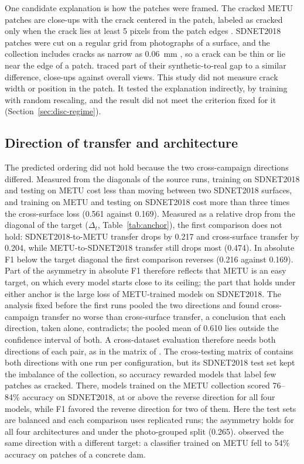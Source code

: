 \documentclass[pdflatex,sn-apa]{sn-jnl}
\begin{document}
One candidate explanation is how the patches were framed. The cracked METU patches are close-ups with the crack centered in the patch, labeled as cracked only when the crack lies at least 5 pixels from the patch edges \citep{santos2022}. SDNET2018 patches were cut on a regular grid from photographs of a surface, and the collection includes cracks as narrow as 0.06~mm \citep{dorafshan2018sdnet}, so a crack can be thin or lie near the edge of a patch. \citet{fountoukidou2024} traced part of their synthetic-to-real gap to a similar difference, close-ups against overall views. This study did not measure crack width or position in the patch. It tested the explanation indirectly, by training with random rescaling, and the result did not meet the criterion fixed for it (Section~\ref{sec:disc-regime}).

\subsection{Direction of transfer and architecture}\label{sec:disc-direction}

The predicted ordering did not hold because the two cross-campaign directions differed. Measured from the diagonals of the source runs, training on SDNET2018 and testing on METU cost less than moving between two SDNET2018 surfaces, and training on METU and testing on SDNET2018 cost more than three times the cross-surface loss (0.561 against 0.169). Measured as a relative drop from the diagonal of the target ($\Delta_t$, Table~\ref{tab:anchor}), the first comparison does not hold: SDNET2018-to-METU transfer drops by 0.217 and cross-surface transfer by 0.204, while METU-to-SDNET2018 transfer still drops most (0.474). In absolute F1 below the target diagonal the first comparison reverses (0.216 against 0.169). Part of the asymmetry in absolute F1 therefore reflects that METU is an easy target, on which every model starts close to its ceiling; the part that holds under either anchor is the large loss of METU-trained models on SDNET2018. The analysis fixed before the first runs pooled the two directions and found cross-campaign transfer no worse than cross-surface transfer, a conclusion that each direction, taken alone, contradicts; the pooled mean of 0.610 lies outside the confidence interval of both. A cross-dataset evaluation therefore needs both directions of each pair, as in the matrix of \citet{torralba2011}. The cross-testing matrix of \citet{rashid2025} contains both directions with one run per configuration, but its SDNET2018 test set kept the imbalance of the collection, so accuracy rewarded models that label few patches as cracked. There, models trained on the METU collection scored 76--84\% accuracy on SDNET2018, at or above the reverse direction for all four models, while F1 favored the reverse direction for two of them. Here the test sets are balanced and each comparison uses replicated runs; the asymmetry holds for all four architectures and under the photo-grouped split (0.265). \citet{santos2022} observed the same direction with a different target: a classifier trained on METU fell to 54\% accuracy on patches of a concrete dam.
\end{document}

